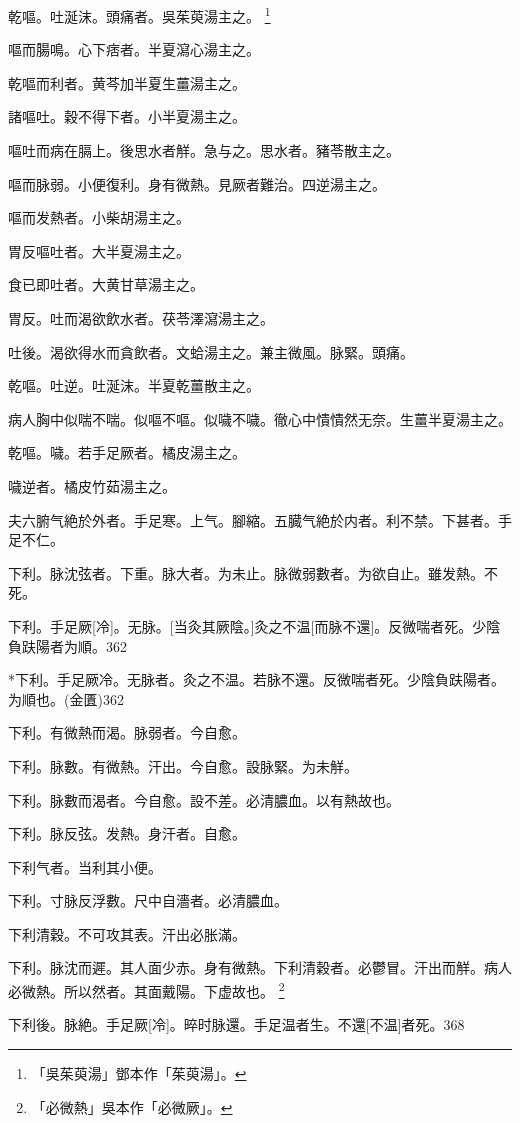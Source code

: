 \documentclass[12pt,oneside,UTF8,b5paper]{ctexbook}她她她她她她她
\begin{document}
乾嘔。吐涎沫。頭痛者。吳茱萸湯主之。
	\footnote{「吳茱萸湯」鄧本作「茱萸湯」。}

嘔而腸鳴。心下痞者。半夏瀉心湯主之。

乾嘔而利者。黄芩加半夏生薑湯主之。

諸嘔吐。穀不得下者。小半夏湯主之。

嘔吐而病在膈上。後思水者觧。急与之。思水者。豬苓散主之。

嘔而脉弱。小便復利。身有微熱。見厥者難治。四逆湯主之。

嘔而发熱者。小柴胡湯主之。

胃反嘔吐者。大半夏湯主之。

食已即吐者。大黄甘草湯主之。

胃反。吐而渴欲飲水者。茯苓澤瀉湯主之。

吐後。渴欲得水而貪飲者。文蛤湯主之。兼主微風。脉緊。頭痛。

乾嘔。吐逆。吐涎沫。半夏乾薑散主之。

病人胸中似喘不喘。似嘔不嘔。似噦不噦。徹心中憒憒然无奈。生薑半夏湯主之。

乾嘔。噦。若手足厥者。橘皮湯主之。

噦逆者。橘皮竹茹湯主之。

夫六腑气絶於外者。手足寒。上气。腳縮。五臓气絶於内者。利不禁。下甚者。手足不仁。

下利。脉沈弦者。下重。脉大者。为未止。脉微弱數者。为欲自止。雖发熱。不死。

下利。手足厥[冷]。无脉。[当灸其厥陰。]灸之不温[而脉不還]。反微喘者死。少陰負趺陽者为順。362

*下利。手足厥冷。无脉者。灸之不温。若脉不還。反微喘者死。少陰負趺陽者。为順也。(金匱)362

下利。有微熱而渴。脉弱者。今自愈。

下利。脉數。有微熱。汗出。今自愈。設脉緊。为未觧。

下利。脉數而渴者。今自愈。設不差。必清膿血。以有熱故也。

下利。脉反弦。发熱。身汗者。自愈。

下利气者。当利其小便。

下利。寸脉反浮數。尺中自濇者。必清膿血。

下利清穀。不可攻其表。汗出必胀滿。

下利。脉沈而遲。其人面少赤。身有微熱。下利清穀者。必鬱冒。汗出而觧。病人必微熱。所以然者。其面戴陽。下虚故也。
	\footnote{「必微熱」吳本作「必微厥」。}

下利後。脉絶。手足厥[冷]。晬时脉還。手足温者生。不還[不温]者死。368
\end{document}
